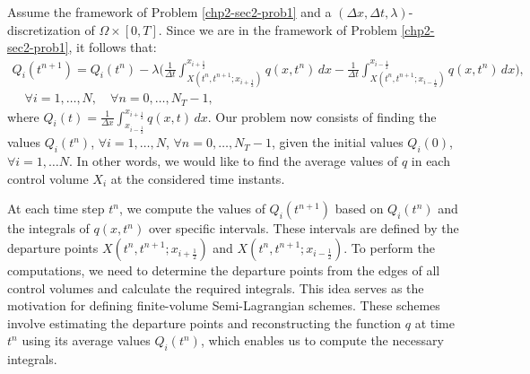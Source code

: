 \begin{prob}
    \label{chp2-sec2-prob3}
	Assume the framework of Problem \ref{chp2-sec2-prob1}
    and a $(\Delta x, \Delta t, \lambda)$-discretization of $\Omega \times [0,T]$.
	Since we are in the framework of Problem \ref{chp2-sec2-prob1}, it follows that:
\begin{equation}
	\label{1d-fvslexact-scheme}
	\begin{split}
{Q}_i(t^{n+1}) =  {Q}_i(t^{n}) -
\lambda
\bigg( \frac{1}{\Delta t}\int_{X(t^n,t^{n+1};x_{i+\frac{1}{2}})}^{x_{i+\frac{1}{2}}}{q}(x, t^n) \,dx-
\frac{1}{\Delta t} \int_{X(t^n,t^{n+1};x_{i-\frac{1}{2}})}^{x_{i-\frac{1}{2}}}{q}(x, t^n) \,dx \bigg),\\
\quad \forall i = 1, \ldots, N,
\quad \forall n = 0, \ldots, N_T-1,
	\end{split}
\end{equation}
	where ${Q}_i(t) = \frac{1}{\Delta x}
	\int_{x_{i-\frac{1}{2}}}^{x_{i+\frac{1}{2}}} {q}(x,t) \,dx$.
	Our problem now consists of finding the values ${Q}_i(t^{n})$, 
	$\forall i = 1, \ldots, N$, $\forall n = 0, \ldots, N_T-1$,
	given the initial values ${Q}_i(0)$, $\forall i = 1, \ldots N$.
	In other words, we would like to find the average values of ${q}$
	in each control volume $X_i$ at the considered time instants.
\end{prob}
At each time step $t^n$, we compute the values of ${Q}_i(t^{n+1})$ based on ${Q}_i(t^{n})$ and the integrals 
of $q(x, t^n)$ over specific intervals. These intervals are defined by the departure points 
$X(t^n, t^{n+1}; x_{i+\frac{1}{2}})$ and $X(t^n, t^{n+1}; x_{i-\frac{1}{2}})$.
To perform the computations, we need to determine the departure points from the edges of all control volumes
and calculate the required integrals. This idea serves as the motivation for defining finite-volume 
Semi-Lagrangian schemes. These schemes involve estimating the departure points and reconstructing the 
function $q$ at time $t^n$ using its average values $Q_i(t^n)$, which enables us to compute the necessary integrals.

